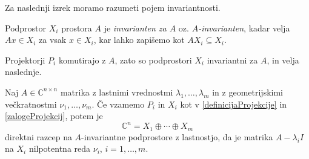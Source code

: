 \documentclass[mat1]{fmfdelo}
\newcommand{\C}{\mathbb C}
\begin{document}
Za naslednji izrek moramo razumeti pojem invariantnosti.
\begin{definicija}
    Podprostor $X_i$ prostora $A$ je \emph{invarianten za $A$} oz. \emph{$A$-invarianten}, kadar velja $A x \in X_i$ za vsak $x \in X_i$, kar lahko zapišemo kot $A X_i \subseteq X_i$.
\end{definicija}
Projektorji $P_i$ komutirajo z $A$, zato so podprostori $X_i$ invariantni za $A$, in velja naslednje. 
\begin{izrek}\label{trditevSpektralniRazcep}
    Naj $A \in \C^{n \times n}$ matrika z lastnimi vrednostmi $\lambda_1, \ldots, \lambda_m$ in z geometrijskimi večkratnostmi $\nu_1, \ldots, \nu_m$. Če vzamemo $P_i$ in $X_i$ kot v \eqref{definicijaProjekcije} in \eqref{zalogeProjekcij}, potem je
    \begin{equation}\label{eqSpektralniRazcep}
        \C^n = X_1 \oplus \cdots \oplus X_m
    \end{equation}
    direktni razcep na $A$-invariantne podprostore z lastnostjo, da je matrika $A - \lambda_i I$ na $X_i$ nilpotentna reda $\nu_i$, $i = 1, \ldots, m$.
\end{izrek}
\end{document}
